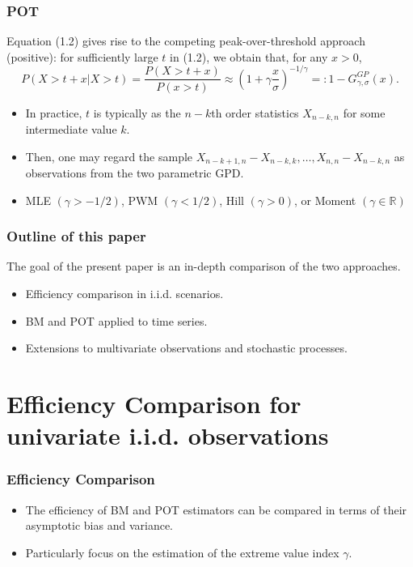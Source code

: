 \documentclass{beamer}
\begin{document}
\begin{frame}
    \frametitle{POT}
Equation (1.2) gives rise to the competing peak-over-threshold approach (positive): for sufficiently large $t$ in (1.2), we obtain that, for any $x>0$,
$$
P(X>t+x|X>t) = \frac{P(X>t+x)}{P(x>t)}\approx (1+\gamma \frac{x}{\sigma})^{-1/\gamma}=:1-G_{\gamma,\sigma}^{GP}(x).
$$
\begin{itemize}
    \item In practice, $t$ is typically as the $n-k$th order statistics $X_{n-k,n}$ for some intermediate value $k$.
    \item Then, one may regard the sample $X_{n-k+1,n}-X_{n-k,k}, \dots, X_{n,n}-X_{n-k,n}$ as observations from the two parametric GPD.
    \item  MLE $(\gamma>-1/2)$, PWM $(\gamma<1/2)$, Hill $(\gamma>0)$, or Moment $(\gamma\in \mathbb{R})$
\end{itemize}

\end{frame}

\begin{frame}
    \frametitle{Outline of this paper}
    The goal of the present paper is an in-depth comparison of the two approaches.
\begin{itemize}
    \item Efficiency comparison in i.i.d. scenarios.
    \vspace{5ex}
    \item BM and POT applied to time series.
    \vspace{5ex}
    \item Extensions to multivariate observations and stochastic processes.
\end{itemize}
    

\end{frame}

\section{Efficiency Comparison for univariate i.i.d. observations}
\begin{frame}
    \frametitle{Efficiency Comparison}
\begin{itemize}
    \item The efficiency of BM and POT estimators can be compared in terms of their asymptotic bias and
    variance.
    \bigskip
    \item Particularly focus on the estimation of the extreme value index $\gamma$.
\end{itemize}
    

\end{frame}
\end{document}
